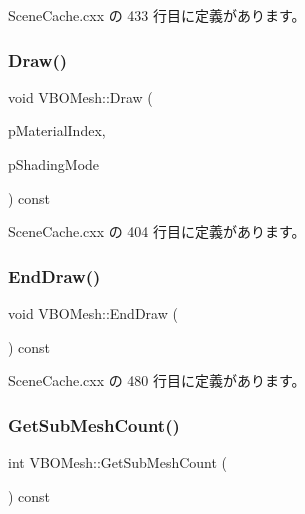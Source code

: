  Scene\+Cache.\+cxx の 433 行目に定義があります。

\mbox{\label{class_v_b_o_mesh_ad01452c36fbf1b0f4daa3c605a8c8126}} 
\subsubsection{\texorpdfstring{Draw()}{Draw()}}
{\footnotesize\ttfamily void V\+B\+O\+Mesh\+::\+Draw (\begin{DoxyParamCaption}\item[{int}]{p\+Material\+Index,  }\item[{\hyperlink{_gl_functions_8h_a474716bb9224d44d614704a0bd331d99}{Shading\+Mode}}]{p\+Shading\+Mode }\end{DoxyParamCaption}) const}



 Scene\+Cache.\+cxx の 404 行目に定義があります。

\mbox{\label{class_v_b_o_mesh_a0d8c1a2cc65ca7e94c50fb67d7713898}} 
\subsubsection{\texorpdfstring{End\+Draw()}{EndDraw()}}
{\footnotesize\ttfamily void V\+B\+O\+Mesh\+::\+End\+Draw (\begin{DoxyParamCaption}{ }\end{DoxyParamCaption}) const}



 Scene\+Cache.\+cxx の 480 行目に定義があります。

\mbox{\label{class_v_b_o_mesh_a3898fc45e87428031716383b43923e2c}} 
\subsubsection{\texorpdfstring{Get\+Sub\+Mesh\+Count()}{GetSubMeshCount()}}
{\footnotesize\ttfamily int V\+B\+O\+Mesh\+::\+Get\+Sub\+Mesh\+Count (\begin{DoxyParamCaption}{ }\end{DoxyParamCaption}) const\hspace{0.3cm}{\ttfamily [inline]}}



